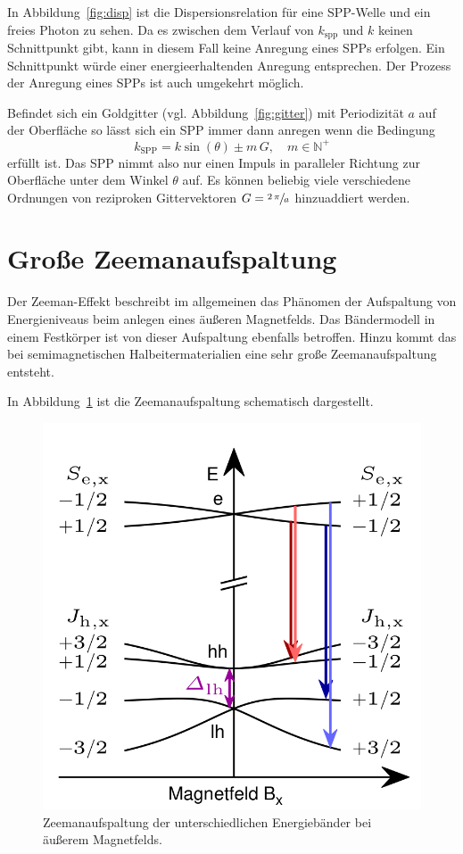 In Abbildung~\ref{fig:disp} ist die Dispersionsrelation für eine SPP-Welle und ein freies Photon zu sehen. 
Da es zwischen dem Verlauf von $k_\text{spp}$ und $k$ keinen Schnittpunkt gibt, kann
in diesem Fall keine Anregung eines SPPs erfolgen. 
Ein Schnittpunkt würde  einer energieerhaltenden Anregung entsprechen.
Der Prozess der Anregung eines SPPs ist auch umgekehrt möglich.

Befindet sich ein Goldgitter (vgl. Abbildung~\ref{fig:gitter}) 
mit Periodizität $a$ auf der Oberfläche so lässt sich 
ein SPP immer dann anregen wenn die Bedingung
\begin{equation}
    k_\text{SPP} = k \sin(\theta) \pm m \, G, \quad  m \in \mathbb{N}^+
\end{equation}
erfüllt ist.
Das SPP nimmt also nur einen Impuls in paralleler Richtung zur Oberfläche unter dem Winkel $\theta$ auf.
Es können beliebig viele verschiedene Ordnungen von
reziproken Gittervektoren $G = \sfrac{2 \, \pi}{a}$ hinzuaddiert werden.

\section{Große Zeemanaufspaltung}

Der Zeeman-Effekt beschreibt im allgemeinen das Phänomen der Aufspaltung von 
Energieniveaus beim anlegen eines äußeren Magnetfelds.
Das Bändermodell in einem Festkörper ist von dieser Aufspaltung ebenfalls betroffen.
Hinzu kommt das bei semimagnetischen Halbeitermaterialien eine sehr große Zeemanaufspaltung
entsteht.\cite{zeeman}

In Abbildung~\ref{fig:zeeman} ist die Zeemanaufspaltung schematisch dargestellt.
\begin{figure}
    \centering
    \includegraphics[scale=0.25]{./Plots/zeeman.png}
    \caption{Zeemanaufspaltung der unterschiedlichen Energiebänder bei äußerem Magnetfelds.\cite{felix}}
    \label{fig:zeeman}
\end{figure}
\FloatBarrier

